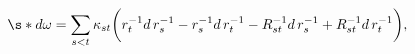 \begin{equation}
 \s* d\omega = \sum_{s<t} \kappa_{st} \biggl(
 r_t^{-1}d\,r_s^{-1} - r_s^{-1}d\,r_t^{-1}
 - R_{st}^{-1} d\,r_s^{-1} + R_{st}^{-1} d\,r_t^{-1}
 \biggr),
\end{equation}

